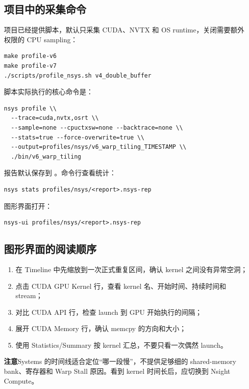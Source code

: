 \documentclass[UTF8,11pt,a4paper,fontset=fandol]{ctexart}
\newcommand{\code}[1]{\texttt{\detokenize{#1}}}
\newcommand{\caution}[1]{\par\noindent\colorbox{PaleOrange}{\parbox{\dimexpr\linewidth-2\fboxsep\relax}{\textbf{注意}\quad #1}}\par}
\newcommand{\pagebreakhere}{\clearpage}
\begin{document}
\subsection{项目中的采集命令}
项目已经提供脚本，默认只采集 CUDA、NVTX 和 OS runtime，关闭需要额外权限的 CPU sampling：
\begin{lstlisting}[style=shell]
make profile-v6
make profile-v7
./scripts/profile_nsys.sh v4_double_buffer
\end{lstlisting}
脚本实际执行的核心命令是：
\begin{lstlisting}[style=shell]
nsys profile \\
  --trace=cuda,nvtx,osrt \\
  --sample=none --cpuctxsw=none --backtrace=none \\
  --stats=true --force-overwrite=true \\
  --output=profiles/nsys/v6_warp_tiling_TIMESTAMP \\
  ./bin/v6_warp_tiling
\end{lstlisting}
报告默认保存到 \code{profiles/nsys/}。命令行查看统计：
\begin{lstlisting}[style=shell]
nsys stats profiles/nsys/<report>.nsys-rep
\end{lstlisting}
图形界面打开：
\begin{lstlisting}[style=shell]
nsys-ui profiles/nsys/<report>.nsys-rep
\end{lstlisting}

\subsection{图形界面的阅读顺序}
\begin{enumerate}
  \item 在 Timeline 中先缩放到一次正式重复区间，确认 kernel 之间没有异常空洞；
  \item 点击 CUDA GPU Kernel 行，查看 kernel 名、开始时间、持续时间和 stream；
  \item 对比 CUDA API 行，检查 launch 到 GPU 开始执行的间隔；
  \item 展开 CUDA Memory 行，确认 memcpy 的方向和大小；
  \item 使用 Statistics/Summary 按 kernel 汇总，不要只看一次偶然 launch。
\end{enumerate}

\caution{Systems 的时间线适合定位“哪一段慢”，不提供足够细的 shared-memory bank、寄存器和 Warp Stall 原因。看到 kernel 时间长后，应切换到 Nsight Compute。}

\pagebreakhere
\end{document}
